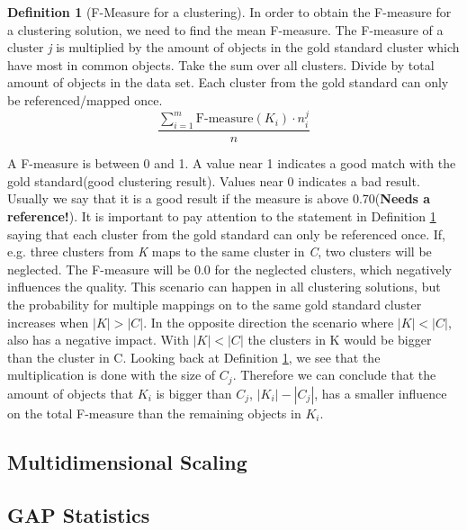 \documentclass[a4paper,10pt]{article}
\theoremstyle{plain}
\theoremstyle{definition}
\newtheorem{defn}{Definition}
\begin{document}
\begin{defn}[F-Measure for a clustering]\label{def:mean F-measure}
	In order to obtain the F-measure for a clustering solution, we need to find the mean F-measure. The F-measure of a cluster \textit{j} is multiplied by the amount of objects in the gold standard cluster which have most in common objects. Take the sum over all clusters. Divide by total amount of objects in the data set. Each cluster from the gold standard can only be referenced/mapped once.
	\begin{equation}
		\frac{\sum_{i = 1}^{m} \text{F-measure}(K_i) \cdot n_{i}^{j}}{n}
	\end{equation}
\end{defn}
A F-measure is between 0 and 1. A value near 1 indicates a good match with the gold standard(good clustering result). Values near 0 indicates a bad result. Usually we say that it is a good result if the measure is above 0.70(\textbf{\large Needs  a reference!}).
It is important to pay attention to the statement in Definition \ref{def:mean F-measure} saying that each cluster from the gold standard can only be referenced once. If, e.g. three clusters from \textit{K} maps to the same cluster in \textit{C}, two clusters will be neglected. The F-measure will be 0.0 for the neglected clusters, which negatively influences the quality. This scenario can happen in all clustering solutions, but the probability for multiple mappings on to the same gold standard cluster increases when $|K|>|C|$. In the opposite direction the scenario where $|K|<|C|$, also has a negative impact. With $|K|<|C|$ the clusters in K would be bigger than the cluster in C. 
Looking back at Definition \ref{def:mean F-measure}, we see that the multiplication is done with the size of $C_j$. Therefore we can conclude that the amount of objects that $K_i$ is bigger than $C_j$, $|K_i|-|C_j|$, has a smaller influence on the total F-measure than the remaining objects in $K_i$.


\subsection{Multidimensional Scaling}

\subsection{GAP Statistics}
\end{document}
